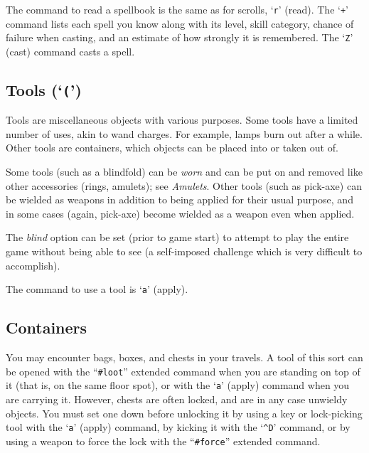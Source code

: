 The command to read a spellbook is the same as for scrolls, `{\tt r}' (read).
The `{\tt +}' command lists each spell you know along with its level, skill
category, chance of failure when casting, and an estimate of how strongly
it is remembered.
The `{\tt Z}' (cast) command casts a spell.

\subsection*{Tools (`{\tt (}')}

Tools are miscellaneous objects with various purposes.  Some tools
have a limited number of uses, akin to wand charges.  For example, lamps burn
out after a while.  Other tools are containers, which objects can
be placed into or taken out of.

Some tools (such as a blindfold) can be {\it worn\/} and can be put on and
removed like other accessories (rings, amulets); see {\it Amulets\/}.
Other tools (such as pick-axe) can be wielded as weapons in addition to
being applied for their usual purpose, and in some cases (again, pick-axe)
become wielded as a weapon even when applied.

The {\it blind\/}
option can be set (prior to game start) to attempt to play the entire
game without being able to see (a self-imposed challenge which is
very difficult to accomplish).

The command to use a tool is `{\tt a}' (apply).

\subsection*{Containers}

You may encounter bags, boxes, and chests in your travels.  A tool of
this sort can be opened with the ``{\tt \#loot}'' extended command when
you are standing on top of it (that is, on the same floor spot),
or with the `{\tt a}' (apply) command when you are carrying it.  However,
chests are often locked, and are in any case unwieldy objects.
You must set one down before unlocking it by
using a key or lock-picking tool with the `{\tt a}' (apply) command,
by kicking it with the `{\tt \^{}D}' command,
or by using a weapon to force the lock with the ``{\tt \#force}''
extended command.


